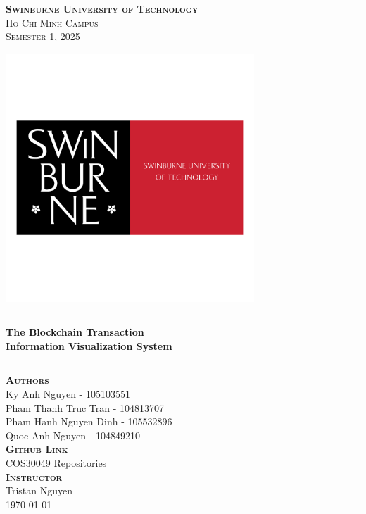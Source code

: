 \begin{titlepage}
\begin{center}
    \textsc{\Large \bfseries Swinburne University of Technology}\\[0.3cm]
    \textsc{\large Ho Chi Minh Campus}\\
    \textsc{\large Semester 1, 2025}
    
    \includegraphics[width=0.7\textwidth]{root/swinburne-university-of-technology-7-logo-png-transparent.png}
    
    \hrule
    \vspace{.2cm}
    {\huge\bfseries The Blockchain Transaction\\\vspace{0.5cm} Information Visualization System} %
    \vspace{.2cm}
    \hrule

    \vspace{0.5cm}
    
    \textsc{\large\textbf{Authors}}\\
    \vspace{.5cm}
    \centering
    Ky Anh Nguyen - 105103551\\
    Pham Thanh Truc Tran - 104813707\\
    Pham Hanh Nguyen Dinh - 105532896\\
    Quoc Anh Nguyen - 104849210\\[1cm]
      \textsc{\large\textbf{Github Link}}\\
    \vspace{.3cm}
    \centering
    \href{https://github.com/orgs/SwinHCMC-COS30049/repositories}{COS30049 Repositories}\\ 
     \vspace{.3cm}
    \textsc{\large\textbf{Instructor}}\\
    \vspace{.3cm}
    Tristan Nguyen\\[0.5cm]
    \centering \today %
\end{center}
\end{titlepage}